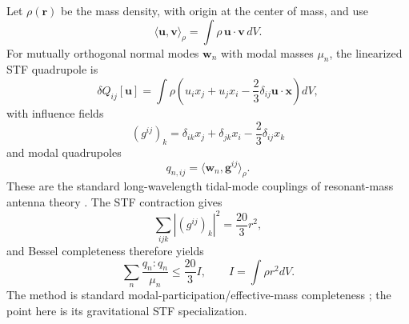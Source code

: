 Let $\rho(\bm r)$ be the mass density, with origin at the center of mass, and use
\begin{equation}
\langle\bm u,\bm v\rangle_\rho
=\int\rho\,\bm u\cdot\bm v\,dV.
\label{eq:massinner}
\end{equation}
For mutually orthogonal normal modes $\bm w_n$ with modal masses $\mu_n$, the linearized STF quadrupole is
\begin{equation}
\delta Q_{ij}[\bm u]
=\int\rho\left(u_ix_j+u_jx_i-\frac23\delta_{ij}\bm u\cdot\bm x\right)dV,
\label{eq:linearQmap}
\end{equation}
with influence fields
\begin{equation}
(g^{ij})_k
=\delta_{ik}x_j+\delta_{jk}x_i-\frac23\delta_{ij}x_k
\label{eq:gijfield}
\end{equation}
and modal quadrupoles
\begin{equation}
q_{n,ij}=\langle\bm w_n,\bm g^{ij}\rangle_\rho.
\label{eq:qmodal}
\end{equation}
These are the standard long-wavelength tidal-mode couplings of resonant-mass antenna theory \cite{Lobo1995}. The STF contraction gives
\begin{equation}
\boxed{
\sum_{ijk}|(g^{ij})_k|^2=\frac{20}{3}r^2,}
\label{eq:gidentity}
\end{equation}
and Bessel completeness therefore yields
\begin{equation}
\boxed{
\sum_n\frac{q_n:q_n}{\mu_n}\le\frac{20}{3}I,
\qquad I=\int\rho r^2dV.}
\label{eq:classicalqsum}
\end{equation}
The method is standard modal-participation/effective-mass completeness \cite{BamfordGaymanWada1971}; the point here is its gravitational STF specialization.

